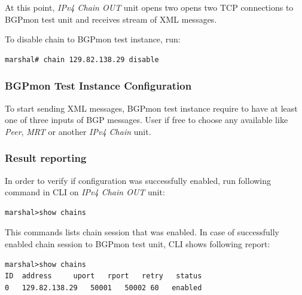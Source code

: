 At this point, \emph{IPv4 Chain OUT} unit opens two opens two TCP connections to BGPmon test unit and receives stream of XML messages. 

To disable chain to BGPmon test instance, run:

\begin{verbatim}
marshal# chain 129.82.138.29 disable
\end{verbatim}


\subsubsection{BGPmon Test Instance Configuration}

To start sending XML messages,  BGPmon test instance require to have at least one of three inputs of BGP messages. User if free to choose any available like \emph{Peer}, \emph{MRT} or another \emph{IPv4 Chain} unit.



\subsubsection{Result reporting}

In order to verify if configuration was successfully enabled, run following command in CLI on \emph{IPv4 Chain OUT} unit:

\begin{verbatim}
marshal>show chains
\end{verbatim}

This commands lists chain session that was enabled. In case of successfully enabled chain session to BGPmon test unit,  CLI  shows following report:

\begin{verbatim}
marshal>show chains
ID	address		uport	rport	retry	status
0	129.82.138.29	50001	50002 60   enabled
\end{verbatim}






